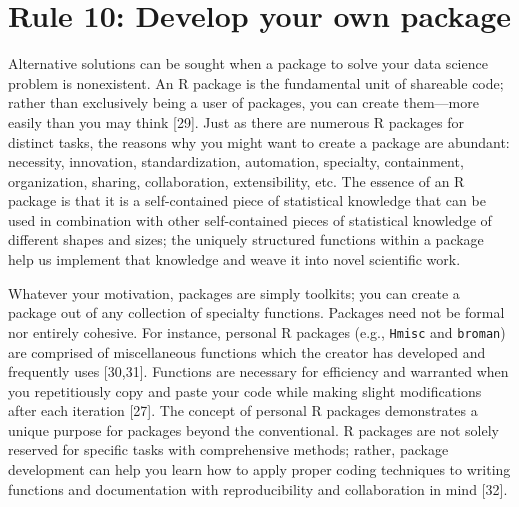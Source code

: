 \documentclass[10pt,letterpaper]{article}
\begin{document}
\hypertarget{rule-10-develop-your-own-package}{%
\section{Rule 10: Develop your own
package}\label{rule-10-develop-your-own-package}}

Alternative solutions can be sought when a package to solve your data
science problem is nonexistent. An R package is the fundamental unit of
shareable code; rather than exclusively being a user of packages, you
can create them---more easily than you may think {[}29{]}. Just as there
are numerous R packages for distinct tasks, the reasons why you might
want to create a package are abundant: necessity, innovation,
standardization, automation, specialty, containment, organization,
sharing, collaboration, extensibility, etc. The essence of an R package
is that it is a self-contained piece of statistical knowledge that can
be used in combination with other self-contained pieces of statistical
knowledge of different shapes and sizes; the uniquely structured
functions within a package help us implement that knowledge and weave it
into novel scientific work.

Whatever your motivation, packages are simply toolkits; you can create a
package out of any collection of specialty functions. Packages need not
be formal nor entirely cohesive. For instance, personal R packages
(e.g., \texttt{Hmisc} and \texttt{broman}) are comprised of
miscellaneous functions which the creator has developed and frequently
uses {[}30,31{]}. Functions are necessary for efficiency and warranted
when you repetitiously copy and paste your code while making slight
modifications after each iteration {[}27{]}. The concept of personal R
packages demonstrates a unique purpose for packages beyond the
conventional. R packages are not solely reserved for specific tasks with
comprehensive methods; rather, package development can help you learn
how to apply proper coding techniques to writing functions and
documentation with reproducibility and collaboration in mind {[}32{]}.
\end{document}
